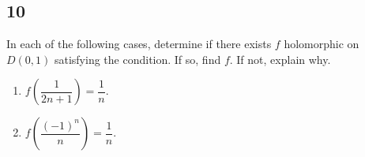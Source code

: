 \documentclass[12pt]{article}
\begin{document}
\newpage 
\subsection*{10}
\begin{tcolorbox}
In each of the following cases, determine if there exists $f$ holomorphic on $D(0,1)$ satisfying the condition. If so, find $f$. If not, explain why.
\begin{enumerate}[label=(\alph*),itemsep=4mm,topsep=3mm]
\item $f\left( \dfrac{1}{2n + 1} \right) = \dfrac{1}{n}$.
\item $f\left( \dfrac{(-1)^{n}}{n} \right) = \dfrac{1}{n}$.
\end{enumerate}
\end{tcolorbox}
\end{document}
